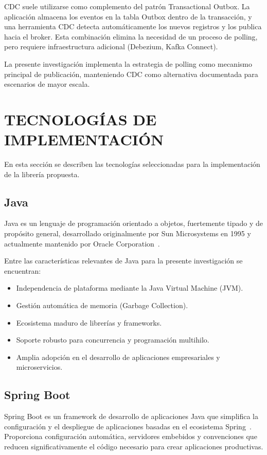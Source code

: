 CDC suele utilizarse como complemento del patrón Transactional Outbox. La aplicación almacena los eventos en la tabla Outbox dentro de la transacción, y una herramienta CDC detecta automáticamente los nuevos registros y los publica hacia el broker. Esta combinación elimina la necesidad de un proceso de polling, pero requiere infraestructura adicional (Debezium, Kafka Connect).

La presente investigación implementa la estrategia de polling como mecanismo principal de publicación, manteniendo CDC como alternativa documentada para escenarios de mayor escala.

\section{TECNOLOGÍAS DE IMPLEMENTACIÓN}

En esta sección se describen las tecnologías seleccionadas para la implementación de la librería propuesta.

\subsection{Java}

Java es un lenguaje de programación orientado a objetos, fuertemente tipado y de propósito general, desarrollado originalmente por Sun Microsystems en 1995 y actualmente mantenido por Oracle Corporation~\parencite{bloch2018}.

Entre las características relevantes de Java para la presente investigación se encuentran:

\begin{itemize}
    \item Independencia de plataforma mediante la Java Virtual Machine (JVM).
    \item Gestión automática de memoria (Garbage Collection).
    \item Ecosistema maduro de librerías y frameworks.
    \item Soporte robusto para concurrencia y programación multihilo.
    \item Amplia adopción en el desarrollo de aplicaciones empresariales y microservicios.
\end{itemize}

\subsection{Spring Boot}

Spring Boot es un framework de desarrollo de aplicaciones Java que simplifica la configuración y el despliegue de aplicaciones basadas en el ecosistema Spring~\parencite{walls2019}. Proporciona configuración automática, servidores embebidos y convenciones que reducen significativamente el código necesario para crear aplicaciones productivas.

